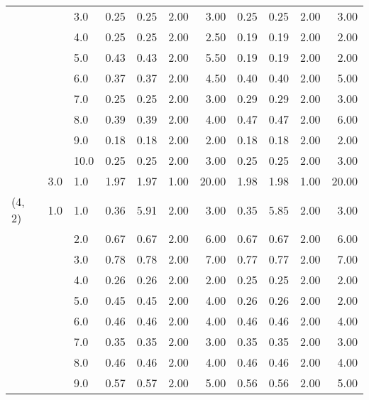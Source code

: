 \begin{tabular}{lllrrrrrrrr}
       &     & 3.0  &       0.25 &      0.25 & 2.00 &   3.00 &       0.25 &      0.25 & 2.00 &   3.00 \\
       &     & 4.0  &       0.25 &      0.25 & 2.00 &   2.50 &       0.19 &      0.19 & 2.00 &   2.00 \\
       &     & 5.0  &       0.43 &      0.43 & 2.00 &   5.50 &       0.19 &      0.19 & 2.00 &   2.00 \\
       &     & 6.0  &       0.37 &      0.37 & 2.00 &   4.50 &       0.40 &      0.40 & 2.00 &   5.00 \\
       &     & 7.0  &       0.25 &      0.25 & 2.00 &   3.00 &       0.29 &      0.29 & 2.00 &   3.00 \\
       &     & 8.0  &       0.39 &      0.39 & 2.00 &   4.00 &       0.47 &      0.47 & 2.00 &   6.00 \\
       &     & 9.0  &       0.18 &      0.18 & 2.00 &   2.00 &       0.18 &      0.18 & 2.00 &   2.00 \\
       &     & 10.0 &       0.25 &      0.25 & 2.00 &   3.00 &       0.25 &      0.25 & 2.00 &   3.00 \\
       & 3.0 & 1.0  &       1.97 &      1.97 & 1.00 &  20.00 &       1.98 &      1.98 & 1.00 &  20.00 \\
(4, 2) & 1.0 & 1.0  &       0.36 &      5.91 & 2.00 &   3.00 &       0.35 &      5.85 & 2.00 &   3.00 \\
       &     & 2.0  &       0.67 &      0.67 & 2.00 &   6.00 &       0.67 &      0.67 & 2.00 &   6.00 \\
       &     & 3.0  &       0.78 &      0.78 & 2.00 &   7.00 &       0.77 &      0.77 & 2.00 &   7.00 \\
       &     & 4.0  &       0.26 &      0.26 & 2.00 &   2.00 &       0.25 &      0.25 & 2.00 &   2.00 \\
       &     & 5.0  &       0.45 &      0.45 & 2.00 &   4.00 &       0.26 &      0.26 & 2.00 &   2.00 \\
       &     & 6.0  &       0.46 &      0.46 & 2.00 &   4.00 &       0.46 &      0.46 & 2.00 &   4.00 \\
       &     & 7.0  &       0.35 &      0.35 & 2.00 &   3.00 &       0.35 &      0.35 & 2.00 &   3.00 \\
       &     & 8.0  &       0.46 &      0.46 & 2.00 &   4.00 &       0.46 &      0.46 & 2.00 &   4.00 \\
       &     & 9.0  &       0.57 &      0.57 & 2.00 &   5.00 &       0.56 &      0.56 & 2.00 &   5.00 \\

\end{tabular}
